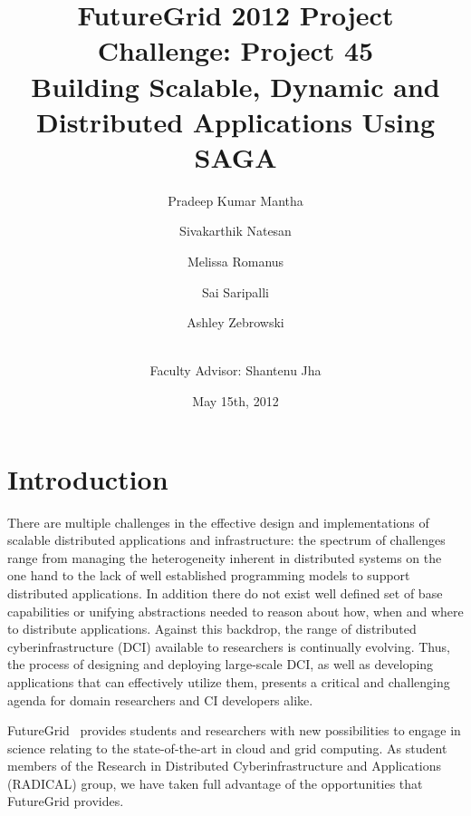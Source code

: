 \documentclass[]{paper}
\begin{document}
\title{FutureGrid 2012 Project Challenge: Project 45\\ Building Scalable, Dynamic and Distributed Applications Using SAGA}
\author{Pradeep Kumar Mantha 
  \and Sivakarthik Natesan 
  \and Melissa Romanus \\
  \and Sai Saripalli 
  \and Ashley Zebrowski 
  \and \\ \hspace{-3.35in} \large{Faculty Advisor: Shantenu Jha}\\
  }

\date{May 15th, 2012}
\maketitle


\section{Introduction}


There are multiple challenges in the effective design and implementations of scalable distributed applications and infrastructure: the spectrum of challenges range from managing the heterogeneity inherent in distributed systems on the one hand to the lack of well established programming models to support distributed applications. In addition there do not exist well defined set of base capabilities or unifying abstractions needed to reason about how, when and where to distribute applications. Against this backdrop, the range of distributed cyberinfrastructure (DCI) available to researchers is continually evolving.  Thus, the process of designing and deploying large-scale DCI, as well as developing applications that can effectively utilize them, presents a critical and challenging agenda for domain researchers and CI developers alike.

FutureGrid~\cite{fg} provides students and researchers with new possibilities to engage in science relating to the state-of-the-art in cloud and grid computing.  As student members of the Research in Distributed Cyberinfrastructure and Applications (RADICAL) group, we have taken full advantage of the opportunities that FutureGrid provides.
\end{document}
